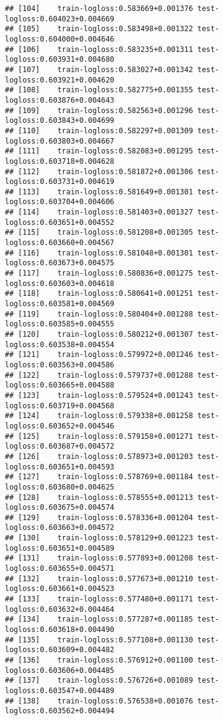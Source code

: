\documentclass[
]{article}
\begin{document}
\begin{verbatim}
## [104]    train-logloss:0.583669+0.001376 test-logloss:0.604023+0.004669 
## [105]    train-logloss:0.583498+0.001322 test-logloss:0.604000+0.004646 
## [106]    train-logloss:0.583235+0.001311 test-logloss:0.603931+0.004680 
## [107]    train-logloss:0.583027+0.001342 test-logloss:0.603921+0.004620 
## [108]    train-logloss:0.582775+0.001355 test-logloss:0.603876+0.004643 
## [109]    train-logloss:0.582563+0.001296 test-logloss:0.603843+0.004699 
## [110]    train-logloss:0.582297+0.001309 test-logloss:0.603803+0.004667 
## [111]    train-logloss:0.582083+0.001295 test-logloss:0.603718+0.004628 
## [112]    train-logloss:0.581872+0.001306 test-logloss:0.603731+0.004619 
## [113]    train-logloss:0.581649+0.001301 test-logloss:0.603704+0.004606 
## [114]    train-logloss:0.581403+0.001327 test-logloss:0.603651+0.004552 
## [115]    train-logloss:0.581208+0.001305 test-logloss:0.603660+0.004567 
## [116]    train-logloss:0.581048+0.001301 test-logloss:0.603673+0.004575 
## [117]    train-logloss:0.580836+0.001275 test-logloss:0.603603+0.004618 
## [118]    train-logloss:0.580641+0.001251 test-logloss:0.603581+0.004569 
## [119]    train-logloss:0.580404+0.001288 test-logloss:0.603585+0.004555 
## [120]    train-logloss:0.580212+0.001307 test-logloss:0.603538+0.004554 
## [121]    train-logloss:0.579972+0.001246 test-logloss:0.603563+0.004586 
## [122]    train-logloss:0.579737+0.001288 test-logloss:0.603665+0.004588 
## [123]    train-logloss:0.579524+0.001243 test-logloss:0.603719+0.004568 
## [124]    train-logloss:0.579338+0.001258 test-logloss:0.603652+0.004546 
## [125]    train-logloss:0.579158+0.001271 test-logloss:0.603687+0.004572 
## [126]    train-logloss:0.578973+0.001203 test-logloss:0.603651+0.004593 
## [127]    train-logloss:0.578769+0.001184 test-logloss:0.603680+0.004625 
## [128]    train-logloss:0.578555+0.001213 test-logloss:0.603675+0.004574 
## [129]    train-logloss:0.578336+0.001204 test-logloss:0.603663+0.004572 
## [130]    train-logloss:0.578129+0.001223 test-logloss:0.603651+0.004589 
## [131]    train-logloss:0.577893+0.001208 test-logloss:0.603655+0.004571 
## [132]    train-logloss:0.577673+0.001210 test-logloss:0.603661+0.004523 
## [133]    train-logloss:0.577480+0.001171 test-logloss:0.603632+0.004464 
## [134]    train-logloss:0.577287+0.001185 test-logloss:0.603618+0.004490 
## [135]    train-logloss:0.577108+0.001130 test-logloss:0.603609+0.004482 
## [136]    train-logloss:0.576912+0.001100 test-logloss:0.603606+0.004485 
## [137]    train-logloss:0.576726+0.001089 test-logloss:0.603547+0.004489 
## [138]    train-logloss:0.576538+0.001076 test-logloss:0.603562+0.004494 

\end{verbatim}
\end{document}
